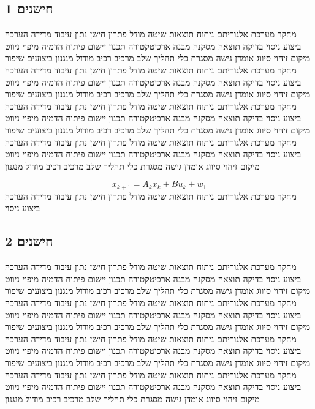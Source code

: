 \subsection{חישנים 1}
\label{sub:ch03_1}
מחקר מערכת אלגוריתם ניתוח תוצאות שיטה מודל פתרון חישן נתון עיבוד מדידה הערכה ביצוע ניסוי בדיקה תוצאה מסקנה מבנה ארכיטקטורה תכנון יישום פיתוח הדמיה מיפוי ניווט מיקום זיהוי סיווג אומדן גישה מסגרת כלי תהליך שלב מרכיב רכיב מודול מנגנון ביצועים שיפור מחקר מערכת אלגוריתם ניתוח תוצאות שיטה מודל פתרון חישן נתון עיבוד מדידה הערכה ביצוע ניסוי בדיקה תוצאה מסקנה מבנה ארכיטקטורה תכנון יישום פיתוח הדמיה מיפוי ניווט מיקום זיהוי סיווג אומדן גישה מסגרת כלי תהליך שלב מרכיב רכיב מודול מנגנון ביצועים שיפור מחקר מערכת אלגוריתם ניתוח תוצאות שיטה מודל פתרון חישן נתון עיבוד מדידה הערכה ביצוע ניסוי בדיקה תוצאה מסקנה מבנה ארכיטקטורה תכנון יישום פיתוח הדמיה מיפוי ניווט מיקום זיהוי סיווג אומדן גישה מסגרת כלי תהליך שלב מרכיב רכיב מודול מנגנון ביצועים שיפור מחקר מערכת אלגוריתם ניתוח תוצאות שיטה מודל פתרון חישן נתון עיבוד מדידה הערכה ביצוע ניסוי בדיקה תוצאה מסקנה מבנה ארכיטקטורה תכנון יישום פיתוח הדמיה מיפוי ניווט מיקום זיהוי סיווג אומדן גישה מסגרת כלי תהליך שלב מרכיב רכיב מודול מנגנון

\begin{equation}
    x_{k+1} = A_{k} x_k + B u_{k} + w_{1}
    \label{eq:ch03_1}
\end{equation}
מחקר מערכת אלגוריתם ניתוח תוצאות שיטה מודל פתרון חישן נתון עיבוד מדידה הערכה ביצוע ניסוי

\subsection{חישנים 2}
\label{sub:ch03_2}
מחקר מערכת אלגוריתם ניתוח תוצאות שיטה מודל פתרון חישן נתון עיבוד מדידה הערכה ביצוע ניסוי בדיקה תוצאה מסקנה מבנה ארכיטקטורה תכנון יישום פיתוח הדמיה מיפוי ניווט מיקום זיהוי סיווג אומדן גישה מסגרת כלי תהליך שלב מרכיב רכיב מודול מנגנון ביצועים שיפור מחקר מערכת אלגוריתם ניתוח תוצאות שיטה מודל פתרון חישן נתון עיבוד מדידה הערכה ביצוע ניסוי בדיקה תוצאה מסקנה מבנה ארכיטקטורה תכנון יישום פיתוח הדמיה מיפוי ניווט מיקום זיהוי סיווג אומדן גישה מסגרת כלי תהליך שלב מרכיב רכיב מודול מנגנון ביצועים שיפור מחקר מערכת אלגוריתם ניתוח תוצאות שיטה מודל פתרון חישן נתון עיבוד מדידה הערכה ביצוע ניסוי בדיקה תוצאה מסקנה מבנה ארכיטקטורה תכנון יישום פיתוח הדמיה מיפוי ניווט מיקום זיהוי סיווג אומדן גישה מסגרת כלי תהליך שלב מרכיב רכיב מודול מנגנון ביצועים שיפור מחקר מערכת אלגוריתם ניתוח תוצאות שיטה מודל פתרון חישן נתון עיבוד מדידה הערכה ביצוע ניסוי בדיקה תוצאה מסקנה מבנה ארכיטקטורה תכנון יישום פיתוח הדמיה מיפוי ניווט מיקום זיהוי סיווג אומדן גישה מסגרת כלי תהליך שלב מרכיב רכיב מודול מנגנון

